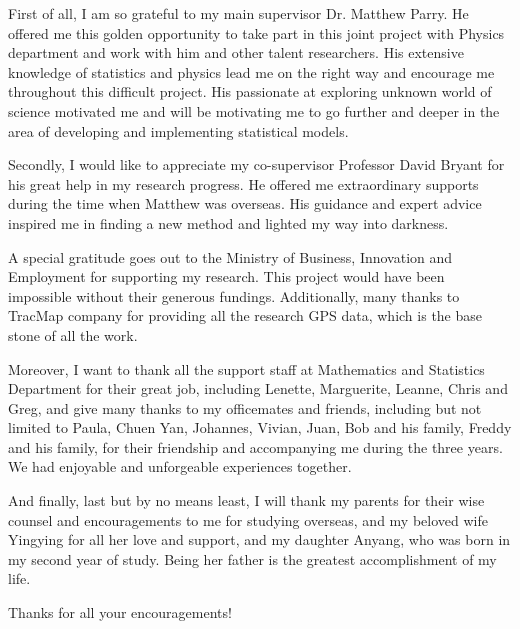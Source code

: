 First of all, I am so grateful to my main supervisor Dr. Matthew Parry. He offered me this golden opportunity to take part in this joint project with Physics department and work with him and other talent researchers. His extensive knowledge of statistics and physics lead me on the right way and encourage me throughout this difficult project. His passionate at exploring unknown world of science motivated me and will be motivating me to go further and deeper in the area of developing and implementing statistical models.  

Secondly, I would like to appreciate my co-supervisor Professor David Bryant for his great help in my research progress. He offered me extraordinary supports during the time when Matthew was overseas. His guidance and expert advice inspired me in finding a new method and lighted my way into darkness. 

A special gratitude goes out to the Ministry of Business, Innovation and Employment for supporting my research. This project would have been impossible without their generous fundings. Additionally, many thanks to TracMap company for providing all the research GPS data, which is the base stone of all the work. 

Moreover, I want to thank all the support staff at Mathematics and Statistics Department for their great job, including Lenette, Marguerite, Leanne, Chris and Greg, and give many thanks to my officemates and friends, including but not limited to Paula, Chuen Yan, Johannes, Vivian, Juan, Bob and his family, Freddy and his family, for their friendship and accompanying me during the three years. We had enjoyable and unforgeable experiences together. 

And finally, last but by no means least, I will thank my parents for their wise counsel and encouragements to me for studying overseas, and my beloved wife Yingying for all her love and support, and my daughter Anyang, who was born in my second year of study. Being her father is the greatest accomplishment of my life.

Thanks for all your encouragements! 

